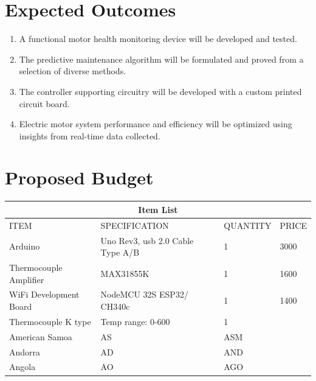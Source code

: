\section{Expected Outcomes}
\begin{enumerate}
\item A functional motor health monitoring device will be developed and tested.
\item The predictive maintenance algorithm will be formulated and proved from a selection
of diverse methods.
\item The controller supporting circuitry will be developed with a custom printed circuit
board.
\item Electric motor system performance and efficiency will be optimized using insights from real-time data collected.
\end{enumerate}
\newpage
\section{Proposed Budget}
\setlength{\arrayrulewidth}{0.5mm}
\setlength{\tabcolsep}{18pt}
\renewcommand{\arraystretch}{1.5}
	\begin{tabular}{ |p{3cm}|p{3cm}|p{3cm}|p{3cm}|  }
		\hline
		\multicolumn{4}{|c|}{\textbf{Item List}} \\
		\hline
		ITEM & SPECIFICATION & QUANTITY & PRICE \\
		\hline
		Arduino & Uno Rev3, usb 2.0 Cable Type A/B & 1 & 3000 \\
		\hline
		Thermocouple Amplifier & MAX31855K & 1 & 1600 \\
		\hline
		WiFi Development Board & NodeMCU 32S ESP32/ CH340c  & 1 & 1400 \\
		\hline
		Thermocouple K type&Temp range: 0-600  & 1 & \\
		American Samoa & AS & ASM & \\
		Andorra & AD & AND   &\\
		Angola & AO & AGO &\\
		\hline
	\end{tabular}
